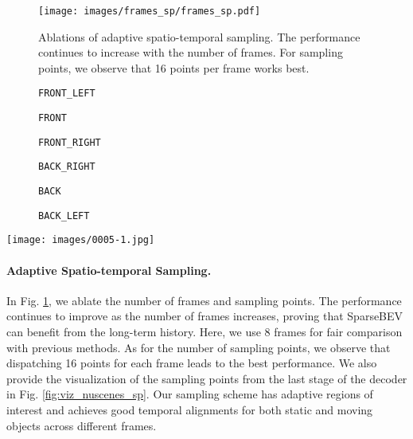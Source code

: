 \documentclass[10pt,twocolumn,letterpaper]{article}
\begin{document}
\begin{figure}[t]
  \centering
  \texttt{[image: images/frames\_sp/frames\_sp.pdf]}
  \vspace{-20pt}
  \caption{Ablations of adaptive spatio-temporal sampling. The performance continues to increase with the number of frames. For sampling points, we observe that 16 points per frame works best.}
\label{fig:ablation_sampling}
\end{figure}

\begin{figure*}
  \center
  \captionsetup[subfigure]{labelformat=empty}

  \begin{subfigure}[b]{0.166\linewidth}
      \caption{\texttt{FRONT\_LEFT}}
  \end{subfigure}\hfill
  \begin{subfigure}[b]{0.166\linewidth}
      \caption{\texttt{FRONT}}
  \end{subfigure}\hfill
  \begin{subfigure}[b]{0.166\linewidth}
      \caption{\texttt{FRONT\_RIGHT}}
  \end{subfigure}\hfill
  \begin{subfigure}[b]{0.166\linewidth}
      \caption{\texttt{BACK\_RIGHT}}
  \end{subfigure}\hfill
  \begin{subfigure}[b]{0.166\linewidth}
      \caption{\texttt{BACK}}
  \end{subfigure}\hfill
  \begin{subfigure}[b]{0.166\linewidth}
    \caption{\texttt{BACK\_LEFT}}
  \end{subfigure}\hfill

  \vspace{-1pt}
  \texttt{[image: images/0005-1.jpg]}
  \vspace{-15pt}
  \caption{Visualization of adaptive spatio-temporal sampling over three consecutive frames. Different instances are distinguished by colors. Point size indices the depth: larger points are closer to the camera. Our sampling scheme has an adaptive receptive field and is well aligned across different timestamps.}
  \label{fig:viz_nuscenes_sp}
  \vspace{-5pt}
\end{figure*}

\paragraph{Adaptive Spatio-temporal Sampling.} In Fig. \ref{fig:ablation_sampling}, we ablate the number of frames and sampling points. The performance continues to improve as the number of frames increases, proving that SparseBEV can benefit from the long-term history. Here, we use 8 frames for fair comparison with previous methods. As for the number of sampling points, we observe that dispatching 16 points for each frame leads to the best performance. We also provide the visualization of the sampling points from the last stage of the decoder in Fig. \ref{fig:viz_nuscenes_sp}. Our sampling scheme has adaptive regions of interest and achieves good temporal alignments for both static and moving objects across different frames.
\end{document}
